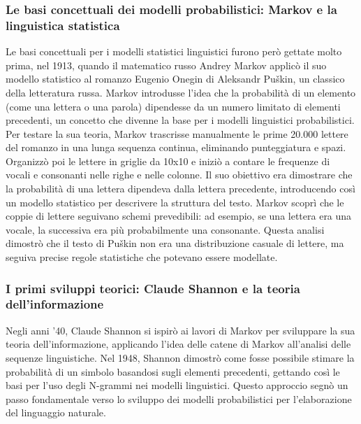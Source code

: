 \documentclass[target=mst,aauheader=,style=]{thud}
\begin{document}
\subsubsection{Le basi concettuali dei modelli probabilistici: Markov e la linguistica statistica}
Le basi concettuali per i modelli statistici linguistici furono però gettate molto prima, nel 1913, quando il matematico russo Andrey Markov applicò il suo modello statistico al romanzo Eugenio Onegin di Aleksandr Puškin, un classico della letteratura russa. Markov introdusse l’idea che la probabilità di un elemento (come una lettera o una parola) dipendesse da un numero limitato di elementi precedenti, un concetto che divenne la base per i modelli linguistici probabilistici. Per testare la sua teoria, Markov trascrisse manualmente le prime 20.000 lettere del romanzo in una lunga sequenza continua, eliminando punteggiatura e spazi. Organizzò poi le lettere in griglie da 10x10 e iniziò a contare le frequenze di vocali e consonanti nelle righe e nelle colonne. Il suo obiettivo era dimostrare che la probabilità di una lettera dipendeva dalla lettera precedente, introducendo così un modello statistico per descrivere la struttura del testo. Markov scoprì che le coppie di lettere seguivano schemi prevedibili: ad esempio, se una lettera era una vocale, la successiva era più probabilmente una consonante. Questa analisi dimostrò che il testo di Puškin non era una distribuzione casuale di lettere, ma seguiva precise regole statistiche che potevano essere modellate.\cite{markov_2006}

\subsubsection{I primi sviluppi teorici: Claude Shannon e la teoria dell’informazione}
Negli anni ’40, Claude Shannon si ispirò ai lavori di Markov per sviluppare la sua teoria dell'informazione, applicando l’idea delle catene di Markov all'analisi delle sequenze linguistiche. Nel 1948, Shannon dimostrò come fosse possibile stimare la probabilità di un simbolo basandosi sugli elementi precedenti, gettando così le basi per l’uso degli N-grammi nei modelli linguistici. Questo approccio segnò un passo fondamentale verso lo sviluppo dei modelli probabilistici per l’elaborazione del linguaggio naturale.\cite{shannon_1948}
\end{document}
